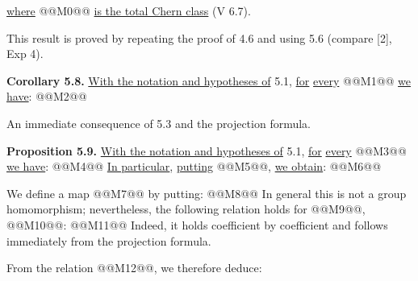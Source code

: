 \uline{where} @@M0@@ \uline{is the total Chern class} (V 6.7).

This result is proved by repeating the proof of 4.6 and using 5.6 (compare [2], Exp 4).

\textbf{Corollary 5.8.} \uline{With the notation and hypotheses of} 5.1, \uline{for} \uline{every} @@M1@@ \uline{we have}:
@@M2@@

An immediate consequence of 5.3 and the projection formula.

\textbf{Proposition 5.9.} \uline{With the notation and hypotheses of} 5.1, \uline{for} \uline{every} @@M3@@ \uline{we have}:
@@M4@@
\uline{In particular}, \uline{putting} @@M5@@, \uline{we obtain}:
@@M6@@

We define a map
@@M7@@
by putting:
@@M8@@
In general this is not a group homomorphism; nevertheless, the following relation holds for @@M9@@, @@M10@@:
@@M11@@
Indeed, it holds coefficient by coefficient and follows immediately from the projection formula.

From the relation @@M12@@, we therefore deduce:
